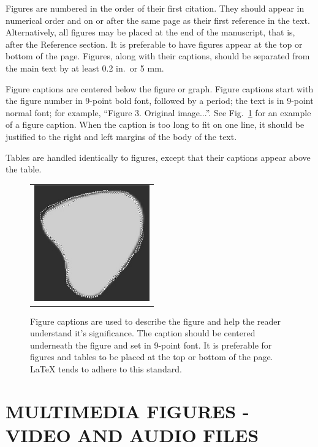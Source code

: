 Figures are numbered in the order of their first citation.  They should appear in numerical order and on or after the same page as their first reference in the text.  Alternatively, all figures may be placed at the end of the manuscript, that is, after the Reference section.  It is preferable to have figures appear at the top or bottom of the page.  Figures, along with their captions, should be separated from the main text by at least 0.2 in.\ or 5 mm.

Figure captions are centered below the figure or graph.  Figure captions start with the figure number in 9-point bold font, followed by a period; the text is in 9-point normal font; for example, ``{\footnotesize{Figure 3.}  Original image...}''.  See Fig.~\ref{fig:example} for an example of a figure caption.  When the caption is too long to fit on one line, it should be justified to the right and left margins of the body of the text.

Tables are handled identically to figures, except that their captions appear above the table.

   \begin{figure} [ht]
   \begin{center}
   \begin{tabular}{c} %
   \includegraphics[height=5cm]{mcr3b.eps}
   \end{tabular}
   \end{center}
   \caption[example]
   { \label{fig:example}
Figure captions are used to describe the figure and help the reader understand it's significance.  The caption should be centered underneath the figure and set in 9-point font.  It is preferable for figures and tables to be placed at the top or bottom of the page. LaTeX tends to adhere to this standard.}
   \end{figure}

\section{MULTIMEDIA FIGURES - VIDEO AND AUDIO FILES}

